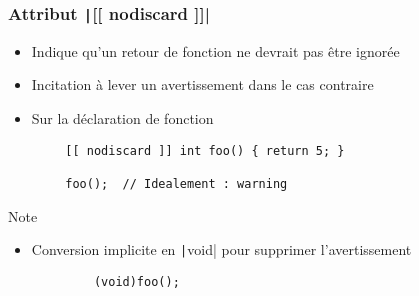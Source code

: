 \documentclass[C++.tex]{subfiles}
\begin{document}
\begin{frame}[fragile]
	\frametitle{Attribut \texttt|[[ nodiscard ]]|}
	\begin{itemize}
		\item Indique qu'un retour de fonction ne devrait pas être ignorée
		\item Incitation à lever un avertissement dans le cas contraire
		\item Sur la déclaration de fonction
	\end{itemize}

	\begin{verbatim}
		[[ nodiscard ]] int foo() { return 5; }

		foo();  // Idealement : warning
	\end{verbatim}

	\begin{block}{Note}
		\begin{itemize}
			\item Conversion implicite en \texttt|void| pour supprimer l'avertissement
		\end{itemize}

		\begin{verbatim}
			(void)foo();
		\end{verbatim}
	\end{block}


\end{frame}
\end{document}
